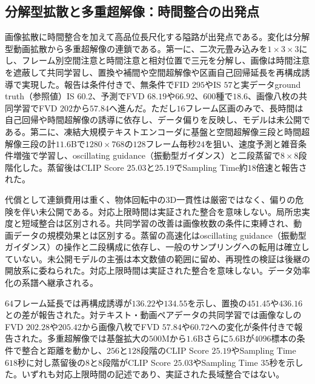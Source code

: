 \documentclass[lualatex,a4paper,10pt]{jlreq}
\begin{document}
\subsection{分解型拡散と多重超解像：時間整合の出発点}
画像拡散に時間整合を加えて高品位長尺化する隘路が出発点である\autocite{btd070}。変化は分解型動画拡散から多重超解像の連鎖である\autocite{btd070,btd071}。第一に、二次元畳み込みを$1 \times 3 \times 3$にし、フレーム別空間注意と時間注意と相対位置で三元を分解し、画像は時間注意を遮蔽して共同学習し、置換や補間や空間超解像や区画自己回帰延長を再構成誘導で実現した\autocite{btd070}。報告は条件付きで、無条件でFID $295$やIS $57$と実データground truth（参照値）IS $60.2$、予測でFVD $68.19$や$66.92$、$600$種で$18.6$、画像八枚の共同学習でFVD $202$から$57.84$へ進んだ\autocite{btd070}。ただし$16$フレーム区画のみで、長時間は自己回帰や時間超解像の誘導に依存し、データ偏りを反映し、モデルは未公開である\autocite{btd070}。第二に、凍結大規模テキストエンコーダに基盤と空間超解像三段と時間超解像三段の計$11.6$Bで$1280 \times 768$の$128$フレーム毎秒$24$を狙い、速度予測と雑音条件増強で学習し、oscillating guidance（振動型ガイダンス）と二段蒸留で$8 \times 8$段階化した\autocite{btd071}。蒸留後はCLIP Score $25.03$と$25.19$でSampling Time約$18$倍速と報告された\autocite{btd071}。

代償として連鎖費用は重く、物体回転中の3D一貫性は厳密ではなく、偏りの危険を伴い未公開である\autocite{btd071}。対応上限時間は実証された整合を意味しない\autocite{btd070,btd071}。局所忠実度と短域整合は区別される\autocite{btd070,btd071}。共同学習の改善は画像枚数の条件に束縛され、動画データの規模効果とは区別する\autocite{btd070}。蒸留の高速化はoscillating guidance（振動型ガイダンス）の操作と二段構成に依存し、一般のサンプリングへの転用は確立していない\autocite{btd071}。未公開モデルの主張は本文数値の範囲に留め、再現性の検証は後継の開放系に委ねられた\autocite{btd070,btd071}。対応上限時間は実証された整合を意味しない\autocite{btd070,btd071}。データ効率化の系譜へ継承される\autocite{btd070,btd071,btd073}。

$64$フレーム延長では再構成誘導が$136.22$や$134.55$を示し、置換の$451.45$や$436.16$との差が報告された\autocite{btd070}。対テキスト・動画ペアデータの共同学習では画像なしのFVD $202.28$や$205.42$から画像八枚でFVD $57.84$や$60.72$への変化が条件付きで報告された\autocite{btd070}。多重超解像では基盤拡大の$500$Mから$1.6$Bさらに$5.6$Bが$4096$標本の条件で整合と距離を動かし、$256$と$128$段階のCLIP Score $25.19$やSampling Time $618$秒に対し蒸留後の$8$と$8$段階がCLIP Score $25.03$やSampling Time $35$秒を示した\autocite{btd071}。いずれも対応上限時間の記述であり、実証された長域整合ではない\autocite{btd070,btd071}。
\end{document}
